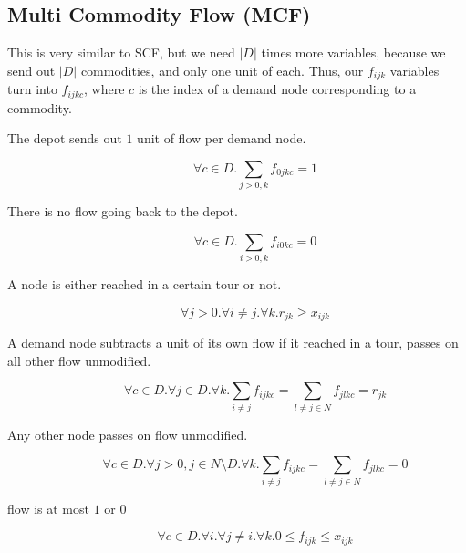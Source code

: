 \subsection{Multi Commodity Flow (MCF)}

This is very similar to SCF, but we need $|D|$ times more variables, because we send out $|D|$ commodities, and only one unit of each. Thus, our $f_{ijk}$ variables turn into $f_{ijkc}$, where $c$ is the index of a demand node corresponding to a commodity.

\begin{description}
  \item[The depot sends out $1$ unit of flow per demand node.]
     \begin{equation}
       \forall c \in D. \sum_{j>0,k} f_{0jkc} = 1
     \end{equation}

  \item[There is no flow going back to the depot.]
     \begin{equation}
       \forall c \in D. \sum_{i>0,k} f_{i0kc} = 0
     \end{equation}

  \item[A node is either reached in a certain tour or not.]
     \begin{equation}
        \forall j>0. \forall i \neq j. \forall k. r_{jk} \geq x_{ijk}
     \end{equation}

  \item[A demand node subtracts a unit of its own flow if it reached in a tour, passes on
        all other flow unmodified.]
  \begin{equation}
        \forall c \in D. \forall j \in D. \forall k. \sum_{i \neq j} f_{ijkc} = \sum_{l \neq j \in N} f_{jlkc} = r_{jk}
  \end{equation}

  \item[Any other node passes on flow unmodified.]
  \begin{equation}
        \forall c \in D. \forall j>0, j \in N \setminus D. \forall k. \sum_{i \neq j} f_{ijkc} = \sum_{l \neq j \in N} f_{jlkc} = 0
  \end{equation}

  \item[flow is at most $1$ or $0$] 

  \begin{equation}
        \forall c \in D. \forall i. \forall j \neq i. \forall k. 0 \leq f_{ijk} \leq x_{ijk}
  \end{equation}

\end{description}

